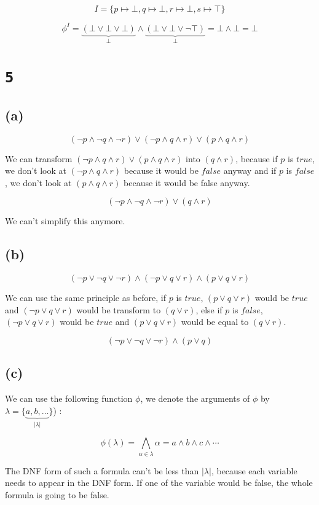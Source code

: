 \documentclass[a4paper,11pt]{report}
\begin{document}
\[
  I =
  \{
  p \mapsto \bot,
  q \mapsto \bot,
  r \mapsto \bot,
  s \mapsto \top
  \}
\]

\[
  \phi^I =  \underbrace{(\bot \vee \bot \vee \bot)}_{\bot} \wedge
  \underbrace{(\bot \vee \bot \vee \neg \top)}_{\bot} = \bot \wedge \bot = \bot
\]

\section*{\texttt{5}}

\subsection*{(a)}

\[
(\neg p \wedge \neg q \wedge \neg r) \vee (\neg p \wedge q \wedge r) \vee (p \wedge q \wedge r)
\]

We can transform $(\neg p \wedge q \wedge r) \vee (p \wedge q \wedge r)$
into $(q \wedge r)$, because if $p$ is $true$, we don't look at $(\neg p \wedge
q \wedge r)$ because it would be $false$ anyway and if $p$ is $false$, we don't
look at $(p \wedge q \wedge r)$ because it would be false anyway.

\[
(\neg p \wedge \neg q \wedge \neg r) \vee (q \wedge r)
\]

We can't simplify this anymore.

\subsection*{(b)}

\[
  (\neg p \vee \neg q \vee \neg r) \wedge (\neg p \vee q \vee r) \wedge (p \vee q \vee r)
\]

We can use the same principle as before, if $p$ is $true$, $(p \vee q \vee r)$
would be $true$ and $(\neg p \vee q \vee r)$ would be transform to $(q \vee r)$,
else if $p$ is $false$, $(\neg p \vee q \vee r)$ would be $true$ and $(p \vee q
\vee r)$ would be equal to $(q \vee r)$.


\[
  (\neg p \vee \neg q \vee \neg r) \wedge (p \vee q)
\]

\subsection*{(c)}

We can use the following function $\phi$, we denote the arguments of $\phi$ by
$\lambda = \{\underbrace{a,b,\dots}_{|\lambda|}\}$) :

\[
  \phi(\lambda) = \bigwedge_{\alpha \in \lambda} \alpha = a \wedge b \wedge c
  \wedge \cdots
\]

The DNF form of such a formula can't be less than $|\lambda|$, because each
variable needs to appear in the DNF form. If one of the variable would be false,
the whole formula is going to be false.
\end{document}
